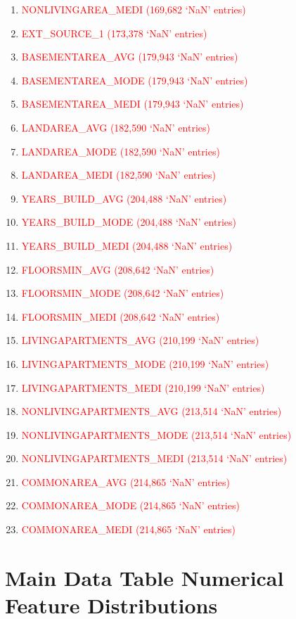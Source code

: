 \documentclass[12pt, letterpaper]{article}
\begin{document}
\begin{appendices}
\begin{enumerate}
 \item \textcolor{red}{NONLIVINGAREA_MEDI (169,682 `NaN' entries)}
 \item \textcolor{red}{EXT_SOURCE_1 (173,378 `NaN' entries)}
 \item \textcolor{red}{BASEMENTAREA_AVG (179,943 `NaN' entries)}
 \item \textcolor{red}{BASEMENTAREA_MODE (179,943 `NaN' entries)}
 \item \textcolor{red}{BASEMENTAREA_MEDI (179,943 `NaN' entries)}
 \item \textcolor{red}{LANDAREA_AVG (182,590 `NaN' entries)}
 \item \textcolor{red}{LANDAREA_MODE (182,590 `NaN' entries)}
 \item \textcolor{red}{LANDAREA_MEDI (182,590 `NaN' entries)}
 \item \textcolor{red}{YEARS_BUILD_AVG (204,488 `NaN' entries)}
 \item \textcolor{red}{YEARS_BUILD_MODE (204,488 `NaN' entries)}
 \item \textcolor{red}{YEARS_BUILD_MEDI (204,488 `NaN' entries)}
 \item \textcolor{red}{FLOORSMIN_AVG (208,642 `NaN' entries)}
 \item \textcolor{red}{FLOORSMIN_MODE (208,642 `NaN' entries)}
 \item \textcolor{red}{FLOORSMIN_MEDI (208,642 `NaN' entries)}
 \item \textcolor{red}{LIVINGAPARTMENTS_AVG (210,199 `NaN' entries)}
 \item \textcolor{red}{LIVINGAPARTMENTS_MODE (210,199 `NaN' entries)}
 \item \textcolor{red}{LIVINGAPARTMENTS_MEDI (210,199 `NaN' entries)}
 \item \textcolor{red}{NONLIVINGAPARTMENTS_AVG (213,514 `NaN' entries)}
 \item \textcolor{red}{NONLIVINGAPARTMENTS_MODE (213,514 `NaN' entries)}
 \item \textcolor{red}{NONLIVINGAPARTMENTS_MEDI (213,514 `NaN' entries)}
 \item \textcolor{red}{COMMONAREA_AVG (214,865 `NaN' entries)}
 \item \textcolor{red}{COMMONAREA_MODE (214,865 `NaN' entries)}
 \item \textcolor{red}{COMMONAREA_MEDI (214,865 `NaN' entries)}
\end{enumerate}
\normalsize

\pagebreak

\section{Main Data Table Numerical Feature Distributions}
\label{appendix:maindatatablefeaturedistributions}


\end{appendices}
\end{document}
